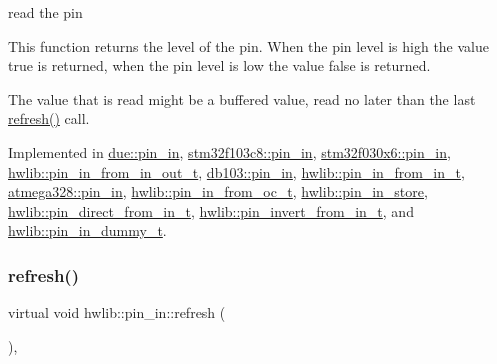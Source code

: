 read the pin

This function returns the level of the pin. When the pin level is high the value true is returned, when the pin level is low the value false is returned.

The value that is read might be a buffered value, read no later than the last \hyperlink{classhwlib_1_1pin__in_a3fb1bfb1ec962bb6d31a5e865f0d0acb}{refresh()} call. 

Implemented in \hyperlink{classdue_1_1pin__in_aa032c49b961b38e4afaeb4a811311449}{due\+::pin\+\_\+in}, \hyperlink{classstm32f103c8_1_1pin__in_aba2e7e6efa14b83d12c30b63f67b9270}{stm32f103c8\+::pin\+\_\+in}, \hyperlink{classstm32f030x6_1_1pin__in_a930e692fe61caf9724c53ac9f0577432}{stm32f030x6\+::pin\+\_\+in}, \hyperlink{classhwlib_1_1pin__in__from__in__out__t_ae2f49f0010b6a6177fad9099e3d7cbd2}{hwlib\+::pin\+\_\+in\+\_\+from\+\_\+in\+\_\+out\+\_\+t}, \hyperlink{classdb103_1_1pin__in_aa45255f1a10bf9496f165e591d5cb329}{db103\+::pin\+\_\+in}, \hyperlink{classhwlib_1_1pin__in__from__in__t_a981fa53647035e85ac71ec426c41b69f}{hwlib\+::pin\+\_\+in\+\_\+from\+\_\+in\+\_\+t}, \hyperlink{classatmega328_1_1pin__in_a77953ce4da1daee0511822ebae5f80e9}{atmega328\+::pin\+\_\+in}, \hyperlink{classhwlib_1_1pin__in__from__oc__t_a451b54793f3bfb713bd90edb115c9ef2}{hwlib\+::pin\+\_\+in\+\_\+from\+\_\+oc\+\_\+t}, \hyperlink{classhwlib_1_1pin__in__store_a561cf1c65fd14dbfba4c352ef4a186fa}{hwlib\+::pin\+\_\+in\+\_\+store}, \hyperlink{classhwlib_1_1pin__direct__from__in__t_aa0f886a0c110b2bd259c6d3d25e50ee3}{hwlib\+::pin\+\_\+direct\+\_\+from\+\_\+in\+\_\+t}, \hyperlink{classhwlib_1_1pin__invert__from__in__t_a41050e62292c67a287bbd9fbce004b45}{hwlib\+::pin\+\_\+invert\+\_\+from\+\_\+in\+\_\+t}, and \hyperlink{classhwlib_1_1pin__in__dummy__t_a669c06692e3742532f8887771ae8feb1}{hwlib\+::pin\+\_\+in\+\_\+dummy\+\_\+t}.

\mbox{\label{classhwlib_1_1pin__in_a3fb1bfb1ec962bb6d31a5e865f0d0acb}} 
\subsubsection{\texorpdfstring{refresh()}{refresh()}}
{\footnotesize\ttfamily virtual void hwlib\+::pin\+\_\+in\+::refresh (\begin{DoxyParamCaption}{ }\end{DoxyParamCaption})\hspace{0.3cm}{\ttfamily [inline]}, {\ttfamily [virtual]}}





